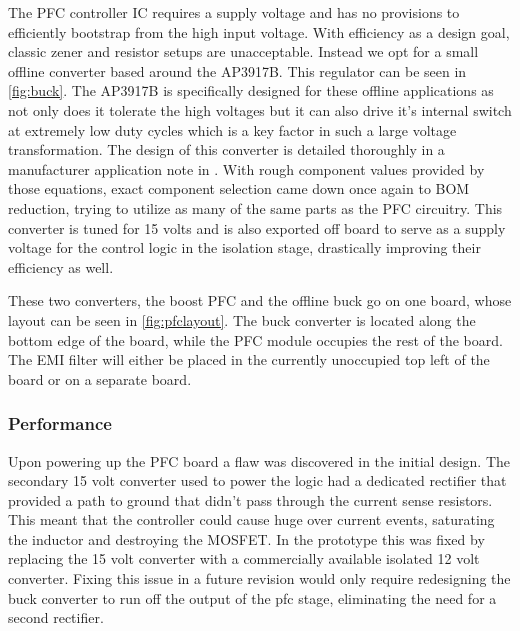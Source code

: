 \documentclass[15pt]{article}
\begin{document}
The PFC controller IC requires a supply voltage and has no provisions to efficiently bootstrap from the high input voltage. With efficiency as a design goal, classic zener and resistor setups are unacceptable. Instead we opt for a small offline converter based around the AP3917B. This regulator can be seen in \autoref{fig:buck}. The AP3917B is specifically designed for these offline applications as not only does it tolerate the high voltages but it can also drive it’s internal switch at extremely low duty cycles which is a key factor in such a large voltage transformation. The design of this converter is detailed thoroughly in a manufacturer application note in \cite{7}. With rough component values provided by those equations, exact component selection came down once again to BOM reduction, trying to utilize as many of the same parts as the PFC circuitry. This converter is tuned for 15 volts and is also exported off board to serve as a supply voltage for the control logic in the isolation stage, drastically improving their efficiency as well.

These two converters, the boost PFC and the offline buck go on one board, whose layout can be seen in \autoref{fig:pfclayout}. The buck converter is located along the bottom edge of the board, while the PFC module occupies the rest of the board. The EMI filter will either be placed in the currently unoccupied top left of the board or on a separate board. 


\subsubsection{Performance}
Upon powering up the PFC board a flaw was discovered in the initial design. The secondary 15 volt converter used to power the logic had a dedicated rectifier that provided a path to ground that didn't pass through the current sense resistors. This meant that the controller could cause huge over current events, saturating the inductor and destroying the MOSFET. In the prototype this was fixed by replacing the 15 volt converter with a commercially available isolated 12 volt converter. Fixing this issue in a future revision would only require redesigning the buck converter to run off the output of the pfc stage, eliminating the need for a second rectifier.
\end{document}
